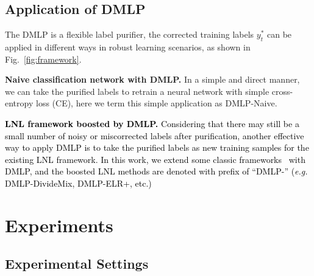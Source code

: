 \documentclass[10pt,twocolumn,letterpaper]{article}
\newcommand{\zbsN}[1]{\textcolor{black}{#1}}
\begin{document}
\subsection{Application of DMLP}\label{stage3}
{The DMLP is a flexible label purifier, the corrected training labels $y_t^*$ can be applied in different ways in robust learning scenarios, as shown in Fig.~\ref{fig:framework}.}

 \textbf{Naive classification network with DMLP.} {In a simple and direct manner, we can take} the purified labels to retrain a neural network with simple cross-entropy loss (CE), here we term this simple application as {DMLP-Naive}.

 \zbsN{\textbf{LNL framework boosted by DMLP.} Considering that there may still be a small number of noisy or miscorrected labels after purification, another effective way to apply DMLP is to take the purified labels as new training samples for the existing LNL framework. In this work, we extend some classic frameworks~\cite{li2020dividemix,2020ELR,2021CDR,Co-han2018co} with DMLP, and the boosted LNL methods are denoted {with prefix of ``DMLP-''} (\emph{e.g.} DMLP-DivideMix, DMLP-ELR+, etc.)}











































\section{Experiments} \label{sec:expriment}
\subsection{Experimental Settings}
\end{document}
